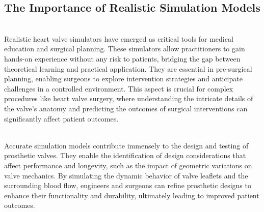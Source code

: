 \subsection{The Importance of Realistic Simulation Models}
\\
Realistic heart valve simulators have emerged as critical tools for medical education and surgical planning. These simulators allow practitioners to gain hands-on experience without any risk to patients, bridging the gap between theoretical learning and practical application. They are essential in pre-surgical planning, enabling surgeons to explore intervention strategies and anticipate challenges in a controlled environment. This aspect is crucial for complex procedures like heart valve surgery, where understanding the intricate details of the valve's anatomy and predicting the outcomes of surgical interventions can significantly affect patient outcomes.


\\
Accurate simulation models contribute immensely to the design and testing of prosthetic valves. They enable the identification of design considerations that affect performance and longevity, such as the impact of geometric variations on valve mechanics. By simulating the dynamic behavior of valve leaflets and the surrounding blood flow, engineers and surgeons can refine prosthetic designs to enhance their functionality and durability, ultimately leading to improved patient outcomes.



